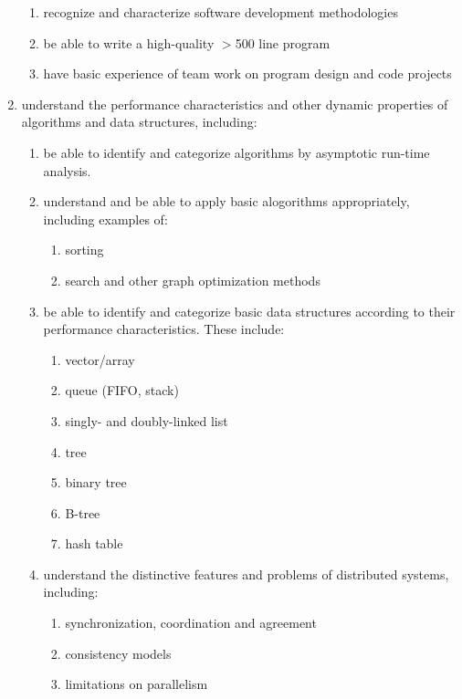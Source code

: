 \documentclass[draft]{article}
\begin{document}
\begin{enumerate}
\begin{enumerate}
   \item recognize and characterize software development methodologies
    \item be able to write a high-quality $>$500 line program
    \item have basic experience of team work on program design and code projects
\end{enumerate}


\item understand the performance characteristics and other dynamic
  properties of algorithms and data structures, including:

  \begin{enumerate}
    \item be able to identify and categorize algorithms by asymptotic run-time analysis.

      \item understand and be able to apply basic alogorithms appropriately, including examples of:
       \begin{enumerate}  
         \item sorting
         \item search and other graph optimization methods
        \end{enumerate}

   \item be able to identify and categorize basic data structures according to their performance characteristics. These include:
    \begin{enumerate}  
      \item vector/array
      \item queue (FIFO, stack)
      \item singly- and doubly-linked list
      \item tree
      \item binary tree
      \item B-tree
      \item hash table
    \end{enumerate}

\item understand the distinctive features and  problems of distributed systems, including:
    \begin{enumerate}  
      \item synchronization, coordination and agreement
      \item consistency models
      \item limitations on parallelism
    \end{enumerate}        


\end{enumerate}
\end{enumerate}
\end{document}
